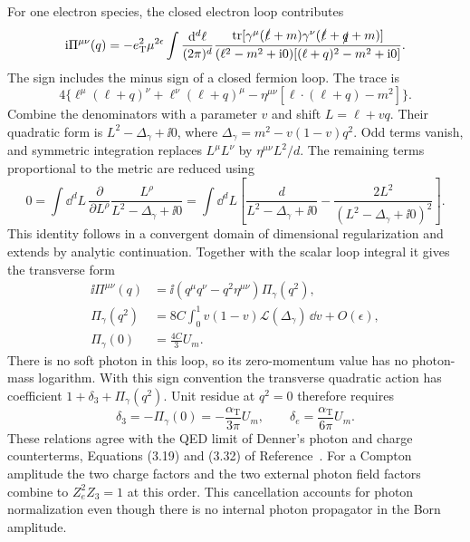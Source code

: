 For one electron species, the closed electron loop contributes
\begin{equation}
 \mathrm{i}\Pi^{\mu\nu}(q)=-e_{\mathrm T}^2\mu^{2\epsilon}
 \int\frac{\dd^d\ell}{(2\pi)^d}
 \frac{\operatorname{tr}[\gamma^\mu(\slashed\ell+m)
           \gamma^\nu(\slashed\ell+\slashed q+m)]}
 { (\ell^2-m^2+\mathrm{i}0)[(\ell+q)^2-m^2+\mathrm{i}0]}.
\end{equation}
The sign includes the minus sign of a closed fermion loop. The trace is
\begin{equation}
 4\{\ell^\mu(\ell+q)^\nu+\ell^\nu(\ell+q)^\mu
       -\eta^{\mu\nu}[\ell\cdot(\ell+q)-m^2]\}.
\end{equation}
Combine the denominators with a parameter $v$ and shift
$L=\ell+vq$. Their quadratic form is
$L^2-\Delta_\gamma+\ii0$, where
$\Delta_\gamma=m^2-v(1-v)q^2$.
Odd terms vanish, and symmetric integration replaces
$L^\mu L^\nu$ by $\eta^{\mu\nu}L^2/d$. The remaining terms
proportional to the metric are reduced using
\begin{equation}
 0=\int\dd^dL\,\frac{\partial}{\partial L^\rho}
       \frac{L^\rho}{L^2-\Delta_\gamma+\ii0}
 =\int\dd^dL\left[\frac{d}{L^2-\Delta_\gamma+\ii0}
       -\frac{2L^2}{(L^2-\Delta_\gamma+\ii0)^2}\right].
\end{equation}
This identity follows in a convergent domain of dimensional
regularization and extends by analytic continuation. Together with
the scalar loop integral it gives the transverse form
\begin{align}
 \ii\Pi^{\mu\nu}(q)
 &=\ii(q^\mu q^\nu-q^2\eta^{\mu\nu})\Pi_\gamma(q^2),\\
 \Pi_\gamma(q^2)
 &=8C\int_0^1v(1-v)\mathcal L(\Delta_\gamma)\,\dd v
       +O(\epsilon),\\
 \Pi_\gamma(0)&=\frac{4C}{3}U_m.
\end{align}
There is no soft photon in this loop, so its zero-momentum value
has no photon-mass logarithm. With this sign convention the transverse
quadratic action has coefficient $1+\delta_3+\Pi_\gamma(q^2)$.
Unit residue at $q^2=0$ therefore requires
\begin{equation}
 \delta_3=-\Pi_\gamma(0)=-\frac{\alpha_{\mathrm T}}{3\pi}U_m,
 \qquad
 \delta_e=\frac{\alpha_{\mathrm T}}{6\pi}U_m.
\end{equation}
These relations agree with the QED limit of Denner's photon and
charge counterterms, Equations (3.19) and (3.32) of
Reference~\cite{compton-overview-denner-renormalization}.
For a Compton amplitude the two charge factors and the two external
photon field factors combine to $Z_e^2Z_3=1$ at this order.
This cancellation accounts for photon normalization even though
there is no internal photon propagator in the Born amplitude.

